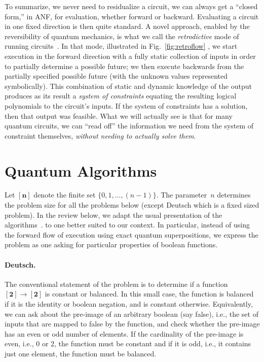 \documentclass[sigplan,screen]{acmart}
\newcommand{\finset}[1]{[\mathbf{#1}]}
\theoremstyle{definition}
\begin{document}
To summarize, we never need to residualize a circuit, we can always
get a ``closed form,'' in ANF, for evaluation, whether forward or
backward. Evaluating a circuit in one fixed direction is then quite
standard. A novel approach, enabled by the reversibility of quantum
mechanics, is what we call the \emph{retrodictive} mode of running
circuits~\cite{retroqc}. In that mode, illustrated in
Fig.~\ref{fig:retroflow} , we start execution in the forward direction
with a fully static collection of inputs in order to partially
determine a possible future; we then execute backwards from the
partially specified possible future (with the unknown values
represented symbolically). This combination of static and dynamic
knowledge of the output produces as its result a \emph{system of
constraints} equating the resulting logical polynomials to the
circuit's inputs. If the system of constraints has a solution, then
that output was feasible. What we will actually see is that for many
quantum circuits, we can ``read off'' the information we need from the
system of constraint themselves, \emph{without needing to actually
solve them}.

\section{Quantum Algorithms}
\label{sec3}

\noindent Let $\finset{n}$ denote the finite set
$\{ 0,1,\ldots,(n-1)\}$. The parameter~$n$ determines the problem size
for all the problems below (except Deutsch which is a fixed sized
problem). In the review below, we adapt the usual presentation of the
algorithms~\cite{doi:10.1137/S0097539796300921,deutsch,deutschJozsa,365701,doi:10.1137/S0097539795293172,nielsen_chuang_2010,10.1145/237814.237866}.
to one better suited to our context. In particular, instead of using
the forward flow of execution using exact quantum superpositions, we
express the problem as one asking for particular properties of boolean
functions.

\paragraph*{Deutsch.}
The conventional statement of the problem is to determine if a
function $\finset{2} \rightarrow \finset{2}$ is constant or
balanced. In this small case, the function is balanced if it is the
identity or boolean negation, and is constant otherwise. Equivalently,
we can ask about the pre-image of an arbitrary boolean (say false),
i.e., the set of inputs that are mapped to false by the function, and
check whether the pre-image has an even or odd number of elements. If
the cardinality of the pre-image is even, i.e., 0 or 2, the function
must be constant and if it is odd, i.e., it contains just one element,
the function must be balanced.
\end{document}
